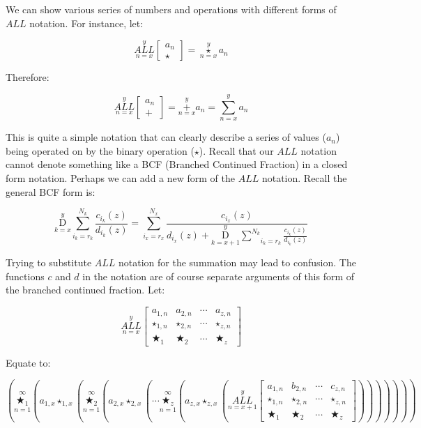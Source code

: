 \documentclass{article}
\begin{document}
We can show various series of numbers and operations with different forms of $ALL$ notation. For instance, let:

$$\underset{n=x}{\overset{y}{ALL}}
\begin{bmatrix}
a_n \\
\star
\end{bmatrix} = \underset{n=x}{\overset{y}{\star}}a_n$$

Therefore:

$$\underset{n=x}{\overset{y}{ALL}}
\begin{bmatrix}
a_n \\
+
\end{bmatrix} = \underset{n=x}{\overset{y}{+}} a_n = \underset{n=x}{\overset{y}{\sum}} a_n$$

This is quite a simple notation that can clearly describe a series of values ($a_n$) being operated on by the binary operation ($\star$). Recall that our $ALL$ notation cannot denote something like a BCF (Branched Continued Fraction) in a closed form notation. Perhaps we can add a new form of the $ALL$ notation. Recall the general BCF form is:

$$\underset{k=x}{\overset{y}{ \mathrm D}} \underset{i_k=r_k}{\overset{N_k}{ \sum}} \frac{c_{i_k} (z)}{d_{i_k} (z)} = \underset{i_x=r_x}{\overset{N_x}{ \sum}} \frac{c_{i_x}(z)}{d_{i_x}(z)+ \underset{k=x+1}{\overset{y}{ \mathrm D}} \underset{i_k=r_k}{\overset{N_k}{ \sum}} \frac{c_{i_k} (z)}{d_{i_k} (z)}}$$

Trying to substitute $ALL$ notation for the summation may lead to confusion. The functions $c$ and $d$ in the notation are of course separate arguments of this form of the branched continued fraction. Let:

$$\underset{n=x}{\overset{y}{ALL}}
\begin{bmatrix}
a_{1,n} & a_{2,n} & \cdots & a_{z,n} \\
\star_{1,n} & \star_{2,n} & \cdots & \star_{z,n} \\ \bigstar_{1} & \bigstar_{2} & \cdots & \bigstar_{z}
\end{bmatrix}$$

Equate to:

$$(\underset{n=1}{\overset{\infty}{\bigstar_1}}(a_{1,x} \star_{1,x} (\underset{n=1}{\overset{\infty}{\bigstar_2}} (a_{2, x} \star_{2,x} (\cdots \underset{n=1}{\overset{\infty}{\bigstar_z}} (a_{z,x} \star_{z,x} (\underset{n=x+1}{\overset{y}{ALL}}
\begin{bmatrix}
a_{1,n} & b_{2,n} & \cdots & c_{z,n} \\
\star_{1,n} & \star_{2,n} & \cdots & \star_{z,n} \\ \bigstar_{1} & \bigstar_{2} & \cdots & \bigstar_{z}
\end{bmatrix})))))))$$
\end{document}
